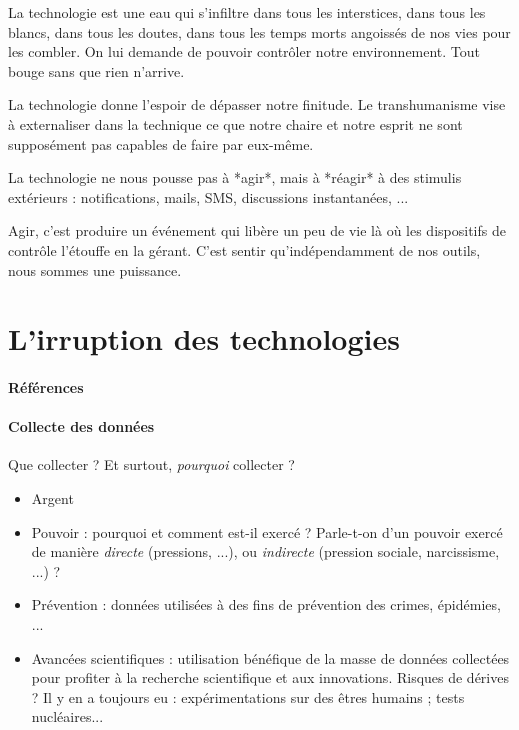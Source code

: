 La technologie est une eau qui s'infiltre dans tous les interstices, dans tous les blancs,
dans tous les doutes, dans tous les temps morts angoissés de nos vies pour les combler.
On lui demande de pouvoir contrôler notre environnement. Tout bouge sans que rien n'arrive. 

La technologie donne l'espoir de dépasser notre finitude. Le transhumanisme vise à
externaliser dans la technique ce que notre chaire et notre esprit ne sont supposément
pas capables de faire par eux-même.

La technologie ne nous pousse pas à *agir*, mais à *réagir* à des stimulis extérieurs :
notifications, mails, SMS, discussions instantanées, ...

Agir, c'est produire un événement qui libère un peu de vie là où les dispositifs de contrôle
l'étouffe en la gérant. C'est sentir qu'indépendamment de nos outils, nous sommes une puissance.


\section{L'irruption des technologies}
\paragraph{Références} \cite{Damasio0} \cite{Marx1} \cite{TechnoSocio0} \cite{GhostInTheShell}

\paragraph{Collecte des données} Que collecter ? Et surtout, \emph{pourquoi} collecter ?
\begin{itemize}
    \item Argent
    \item Pouvoir : pourquoi et comment est-il exercé ? Parle-t-on d'un pouvoir exercé de
    manière \emph{directe} (pressions, ...), ou \emph{indirecte} (pression sociale,
    narcissisme, ...) ?
    \item Prévention : données utilisées à des fins de prévention des crimes, épidémies, ...
    \item Avancées scientifiques : utilisation bénéfique de la masse de données collectées
    pour profiter à la recherche scientifique et aux innovations. Risques de dérives ? Il y
    en a toujours eu : expérimentations sur des êtres humains ; tests nucléaires... 
\end{itemize}


